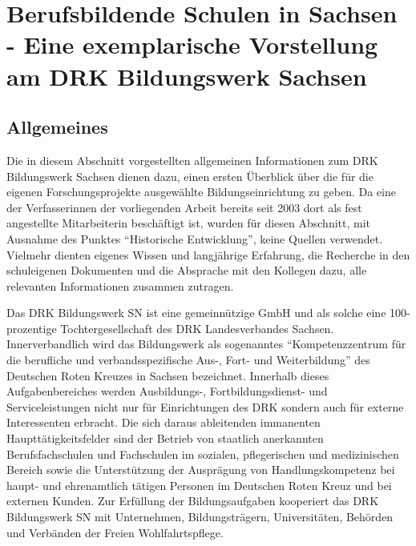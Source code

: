 \section[Vorstellung des DRK Bildungswerk Sachsen]{Berufsbildende Schulen in Sachsen - Eine exemplarische Vorstellung am DRK Bildungswerk Sachsen}
\label{sec:BerufsbildendeSchulenInSachsenEineExemplarischeVorstellungAmDRKBildungswerkSachsen}

\subsection{Allgemeines}
\label{sec:Allgemeines}

Die in diesem Abschnitt vorgestellten allgemeinen Informationen zum DRK Bildungswerk Sachsen dienen dazu, einen ersten Überblick über die für die eigenen Forschungsprojekte ausgewählte Bildungseinrichtung zu geben. Da eine der Verfasserinnen der vorliegenden Arbeit bereits seit 2003 dort als fest angestellte Mitarbeiterin beschäftigt ist, wurden für diesen Abschnitt, mit Ausnahme des Punktes "`Historische Entwicklung"', keine Quellen verwendet. Vielmehr dienten eigenes Wissen und langjährige Erfahrung, die Recherche in den schuleigenen Dokumenten und die Absprache mit den Kollegen dazu, alle relevanten Informationen zusammen zutragen.

Das DRK Bildungswerk SN ist eine gemeinnützige GmbH und als solche eine 100-prozentige Tochtergesellschaft des DRK Landesverbandes Sachsen. Innerverbandlich wird das Bildungswerk als sogenanntes "`Kompetenzzentrum für die berufliche und verbandsspezifische Aus-, Fort- und Weiterbildung"' des Deutschen Roten Kreuzes in Sachsen bezeichnet. Innerhalb dieses Aufgabenbereiches werden Ausbildungs-, Fortbildungsdienst- und Serviceleistungen nicht nur für Einrichtungen des DRK sondern auch für externe Interessenten erbracht. Die sich daraus ableitenden immanenten Haupttätigkeitsfelder sind der Betrieb von staatlich anerkannten Berufsfachschulen und Fachschulen im sozialen, pflegerischen und medizinischen Bereich sowie die Unterstützung der Ausprägung von Handlungskompetenz bei haupt- und ehrenamtlich tätigen Personen im Deutschen Roten Kreuz und bei externen Kunden. Zur Erfüllung der Bildungsaufgaben kooperiert das DRK Bildungswerk SN mit  Unternehmen, Bildungsträgern, Universitäten, Behörden und Verbänden der Freien Wohlfahrtspflege.

